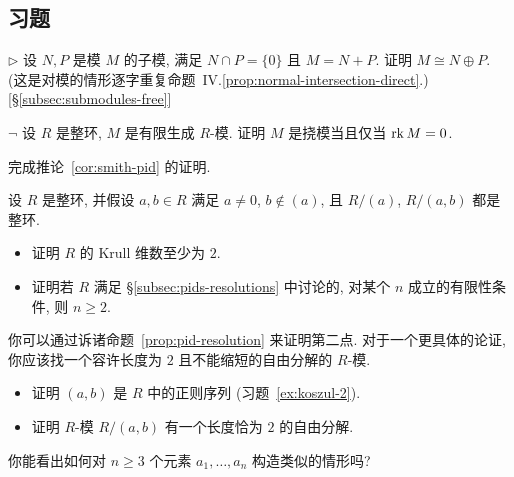 \subsection*{习题}
{}

\begin{prob}\label{ex:direct-sum-np}
$\triangleright$ 设 $N,P$ 是模 $M$ 的子模, 满足 $N\cap P=\{0\}$ 且 $M=N+P$. 证明 $M\cong N\oplus P$. (这是对模的情形逐字重复命题~IV.\ref{prop:normal-intersection-direct}.) [§\ref{subsec:submodules-free}]
\end{prob}

\begin{prob}\label{ex:torsion-rk-zero}
$\neg$ 设 $R$ 是整环, $M$ 是有限生成 $R$-模. 证明 $M$ 是挠模当且仅当 $\operatorname{rk} M=0$.
\end{prob}

\begin{prob}\label{ex:complete-cor5-3}
完成推论~\ref{cor:smith-pid} 的证明.
\end{prob}

\begin{prob}\label{ex:krull-dim-atleast2}
设 $R$ 是整环, 并假设 $a,b\in R$ 满足 $a\neq 0$, $b\notin(a)$, 且 $R/(a)$, $R/(a,b)$ 都是整环.
\begin{itemize}
\item 证明 $R$ 的 Krull 维数至少为 $2$.
\item 证明若 $R$ 满足 §\ref{subsec:pids-resolutions} 中讨论的, 对某个 $n$ 成立的有限性条件, 则 $n\ge 2$.
\end{itemize}
你可以通过诉诸命题~\ref{prop:pid-resolution} 来证明第二点. 对于一个更具体的论证, 你应该找一个容许长度为 $2$ 且不能缩短的自由分解的 $R$-模.
\begin{itemize}
\item 证明 $(a,b)$ 是 $R$ 中的正则序列 (习题~\ref{ex:koszul-2}).
\item 证明 $R$-模 $R/(a,b)$ 有一个长度恰为 $2$ 的自由分解.
\end{itemize}
你能看出如何对 $n\ge 3$ 个元素 $a_1,\ldots,a_n$ 构造类似的情形吗?
\end{prob}

